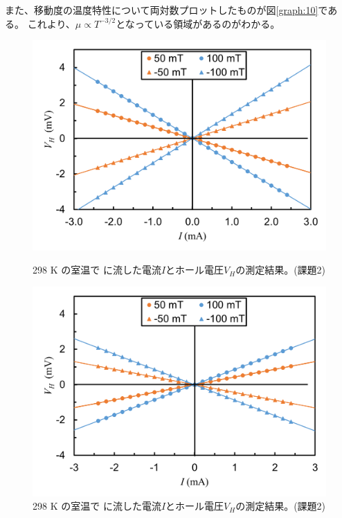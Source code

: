 \documentclass[11pt,dvipdfmx,a4paper]{jsarticle}
\numberwithin{equation}{section}
\begin{document}
また、移動度の温度特性について両対数プロットしたものが図\ref{graph:10}である。
これより、\(\mu\propto T^{-3/2}\)となっている領域があるのがわかる。

\begin{figure}[H]
	\centering
	\begin{minipage}[t]{0.45\columnwidth}
		\centering
		\includegraphics[width=\columnwidth]{graph/graph04.png}
		\caption{\small{298 K の室温で
		に流した電流\(I\)とホール電圧\(V_H\)の測定結果。(課題2)}}
		\label{graph:04}
	\end{minipage}
	\hfil
	\begin{minipage}[t]{0.45\columnwidth}
		\centering
		\includegraphics[width=\columnwidth]{graph/graph05.png}
		\caption{\small{298 K の室温で
		に流した電流\(I\)とホール電圧\(V_H\)の測定結果。(課題2)}}
		\label{graph:05}
	\end{minipage}
\end{figure}
\end{document}
